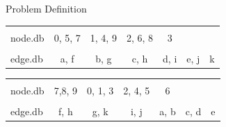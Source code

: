 \documentclass[rgb]{beamer}
\begin{document}
\begin{frame}[allowframebreaks]{Problem Definition}
             \begin{table}[htp]
                \centering
                \begin{tabular}[c]{|l|c|c|c|c|c|c|} \hline
                &&&&&&\\[-1em]
                node.db & \colorbox{blue!30}{0}, \colorbox{red!30}{5}, \colorbox{green!30}{7} & \colorbox{blue!30}{1}, \colorbox{blue!30}{4}, \colorbox{green!30}{9} & \colorbox{blue!30}{2}, \colorbox{red!30}{6}, \colorbox{green!30}{8} & \colorbox{blue!30}{3} &  & \\ \hline
                &&&&&&\\[-1em]
                edge.db & \colorbox{blue!30}{a}, \colorbox{green!30}{f} & \colorbox{blue!30}{b}, \colorbox{green!30}{g} & \colorbox{blue!30}{c}, \colorbox{green!30}{h} & \colorbox{blue!30}{d}, \colorbox{green!30}{i} & \colorbox{red!30}{e}, \colorbox{green!30}{j} & \colorbox{green!30}{k} \\  \hline
                \end{tabular}
                \vspace{0.5cm}
                
                \begin{tabular}{|l | c | c | c | c | c | c|} \hline
                &&&&&&\\[-1em]
                node.db & \colorbox{green!30}{7},\colorbox{green!30}{8}, \colorbox{green!30}{9} & \colorbox{blue!30}{0}, \colorbox{blue!30}{1}, \colorbox{blue!30}{3} & \colorbox{blue!30}{2}, \colorbox{blue!30}{4}, \colorbox{red!30}{5} & \colorbox{red!30}{6} &  & \\ \hline
                &&&&&&\\[-1em]
                 edge.db &  \colorbox{green!30}{f}, \colorbox{green!30}{h} & \colorbox{green!30}{g}, \colorbox{green!30}{k} & \colorbox{green!30}{i}, \colorbox{green!30}{j} & \colorbox{blue!30}{a}, \colorbox{blue!30}{b} & \colorbox{blue!30}{c}, \colorbox{blue!30}{d} & \colorbox{red!30}{e} \\ \hline
                \end{tabular}
            \end{table}
        \end{frame}
        
\end{document}

